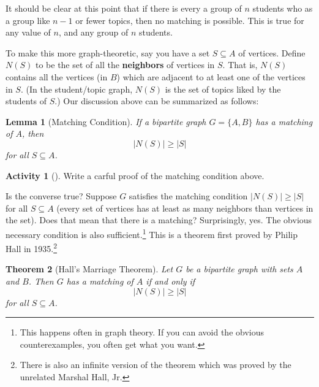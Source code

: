 \documentclass[10pt,]{book}
\newcommand{\terminology}[1]{\textbf{#1}}
\theoremstyle{plain}
\newtheorem{theorem}{Theorem}[section]
\newtheorem{lemma}[theorem]{Lemma}
\theoremstyle{definition}
\theoremstyle{definition}
\theoremstyle{definition}
\newtheorem{activity}[project]{Activity}
\numberwithin{equation}{chapter}
\begin{document}
\par
\hypertarget{p-441}{}%
It should be clear at this point that if there is every a group of \(n\) students who as a group like \(n-1\) or fewer topics, then no matching is possible. This is true for any value of \(n\), and any group of \(n\) students.%
\par
\hypertarget{p-442}{}%
To make this more graph-theoretic, say you have a set \(S \subseteq A\) of vertices. Define \(N(S)\)\label{notation-8}
 to be the set of all the \terminology{neighbors} of vertices in \(S\). That is, \(N(S)\) contains all the vertices (in \(B\)) which are adjacent to at least one of the vertices in \(S\). (In the student/topic graph, \(N(S)\) is the set of topics liked by the students of \(S\).) Our discussion above can be summarized as follows:%
\begin{lemma}[{Matching Condition}]\label{lemma-1}
\hypertarget{p-443}{}%
 If a bipartite graph \(G = \{A, B\}\) has a matching of \(A\), then%
\begin{equation*}
|N(S)| \ge |S|
\end{equation*}
for all \(S \subseteq A\).%
\end{lemma}
\begin{activity}[]\label{activity-50}
\hypertarget{p-444}{}%
Write a carful proof of the matching condition above.%
\end{activity}
\hypertarget{p-445}{}%
Is the converse true? Suppose \(G\) satisfies the matching condition \(|N(S)| \ge |S|\) for all \(S \subseteq A\) (every set of vertices has at least as many neighbors than vertices in the set). Does that mean that there is a matching? Surprisingly, yes. The obvious necessary condition is also sufficient.\footnote{This happens often in graph theory.  If you can avoid the obvious counterexamples, you often get what you want.\label{fn-7}} This is a theorem first proved by Philip Hall in 1935.\footnote{There is also an infinite version of the theorem which was proved by the unrelated Marshal Hall, Jr.\label{fn-8}}%
\begin{theorem}[{Hall's Marriage Theorem}]\label{thm-hallmarriage}
\hypertarget{p-446}{}%
 Let \(G\) be a bipartite graph with sets \(A\) and \(B\). Then \(G\) has a matching of \(A\) if and only if%
\begin{equation*}
|N(S)| \ge |S|
\end{equation*}
for all \(S \subseteq A\).%
\end{theorem}
\hypertarget{p-447}{}%
\end{document}
